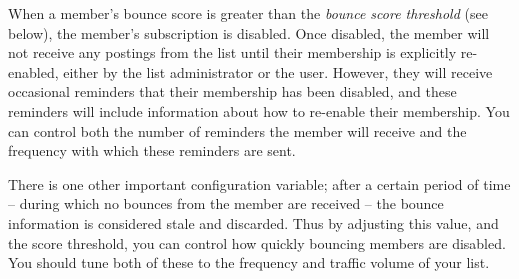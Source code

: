 \documentclass{howto}
\begin{document}
When a member's bounce score is greater than the \emph{bounce score
threshold} (see below), the member's subscription is disabled.  Once
disabled, the member will not receive any postings from the list until
their membership is explicitly re-enabled, either by the list
administrator or the user.  However, they will receive occasional
reminders that their membership has been disabled, and these reminders
will include information about how to re-enable their membership.  You
can control both the number of reminders the member will receive and
the frequency with which these reminders are sent.

There is one other important configuration variable; after a certain
period of time -- during which no bounces from the member are received
-- the bounce information is considered stale and discarded.  Thus by
adjusting this value, and the score threshold, you can control how
quickly bouncing members are disabled.  You should tune both of these
to the frequency and traffic volume of your list.
\end{document}
